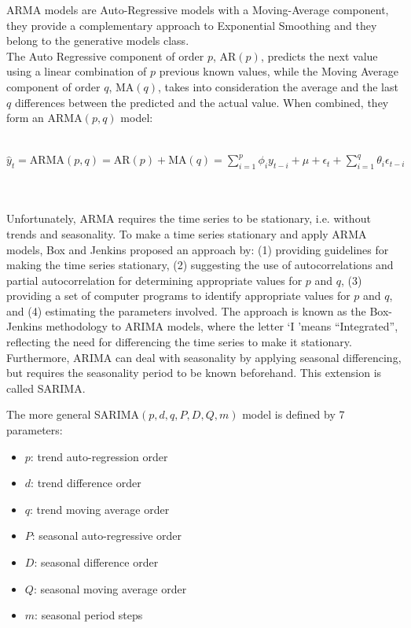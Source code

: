 \documentclass[a4paper, 12pt]{article} %
\begin{document}
	ARMA models are Auto-Regressive models with a Moving-Average component, they provide a complementary approach to Exponential Smoothing and they belong to the generative models class. \\
	The Auto Regressive component of order $p$, $\text{AR}(p)$, predicts the next value using a linear combination of $p$ previous known values, while the Moving Average component of order $q$, $\text{MA}(q)$, takes into consideration the average and the last $q$ differences between the predicted and the actual value.  When combined, they form an ARMA$(p, q)$ model:\\\\
	\centerline{$\hat{y}_{t} = \text{ARMA}(p, q) = \text{AR}(p) + \text{MA}(q)  = \sum_{i=1}^{p}\phi_i y_{t-i} + \mu + \epsilon_t + \sum_{i=1}^{q}\theta_i \epsilon_{t-i} $}\\\\
	Unfortunately, ARMA requires the time series to be stationary, i.e. without trends and seasonality. To make a time series stationary and apply ARMA models, Box and Jenkins \cite{BoxJenkins} proposed an approach by: (1) providing guidelines for making the time series stationary, (2)  suggesting the use of autocorrelations and partial autocorrelation for determining appropriate values for $p$ and $q$, (3) providing a set of computer programs to identify appropriate values for $p$ and $q$, and (4) estimating the parameters involved. The approach is known as the Box-Jenkins methodology to ARIMA models, where the letter \lq I \rq means ``Integrated'', reflecting the need for differencing the time series to make it stationary. Furthermore, ARIMA can deal with seasonality by applying seasonal differencing, but requires the seasonality period to be known beforehand. This extension is called SARIMA.
	
	The more general SARIMA$(p, d, q, P, D, Q, m)$ model is defined by 7 parameters:
	\begin{itemize}
		\item $p$: trend auto-regression order
		\item $d$: trend difference order
		\item $q$: trend moving average order
		\item $P$: seasonal auto-regressive order
		\item $D$: seasonal difference order
		\item $Q$: seasonal moving average order
		\item $m$: seasonal period steps
	\end{itemize}
\end{document}

